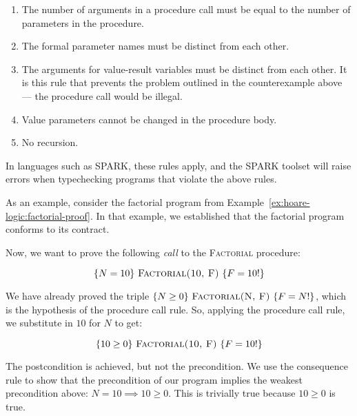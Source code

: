 \begin{enumerate}

 \item The number of arguments in a procedure call must be equal to the number of parameters in the procedure.

 \item The formal parameter names must be distinct from each other.

 \item The arguments for value-result variables must be distinct from each other. It is this rule that prevents the problem outlined in the counterexample above --- the procedure call would be illegal.

 \item Value parameters cannot be changed in the procedure body.

 \item No recursion.

\end{enumerate}

In languages such as SPARK, these rules apply, and the SPARK toolset will raise errors when typechecking programs that violate the above rules.

\begin{example}
As an example, consider the factorial program from Example~\ref{ex:hoare-logic:factorial-proof}. In that example, we established that the factorial program conforms to its contract.

Now, we want to prove the following \emph{call} to the \textsc{Factorial} procedure:

\begin{displaymath}
 \{N = 10\} ~\textsc{Factorial(10, F)}~ \{F = 10!\}
\end{displaymath}

We have already proved the triple $\{N\geq 0\}~ \textsc{Factorial(N, F)}~ \{F = N!\}$, which is the hypothesis of the procedure call rule. So, applying the procedure call rule, we substitute in $10$ for $N$ to get:

\begin{displaymath}
 \{10 \geq 0\} ~\textsc{Factorial(10, F)}~ \{F = 10!\}
\end{displaymath}

The postcondition is achieved, but not the precondition. We use the consequence rule to show that the precondition of our program implies the weakest precondition above: $N = 10 \implies 10 \geq 0$. This is trivially true because $10 \geq 0$ is true.

\end{example}

